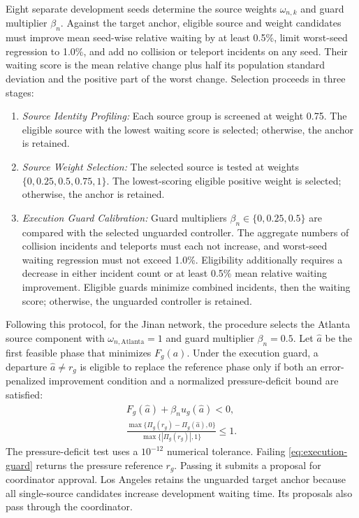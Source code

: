 \documentclass[letterpaper,journal]{IEEEtran}
\begin{document}
Eight separate development seeds determine the source weights $\omega_{n,k}$ and guard multiplier $\beta_n$. Against the target anchor, eligible source and weight candidates must improve mean seed-wise relative waiting by at least 0.5\%, limit worst-seed regression to 1.0\%, and add no collision or teleport incidents on any seed. Their waiting score is the mean relative change plus half its population standard deviation and the positive part of the worst change. Selection proceeds in three stages:
\begin{enumerate}
    \item \textit{Source Identity Profiling:} Each source group is screened at weight 0.75. The eligible source with the lowest waiting score is selected; otherwise, the anchor is retained.
    \item \textit{Source Weight Selection:} The selected source is tested at weights $\{0,0.25,0.5,0.75,1\}$. The lowest-scoring eligible positive weight is selected; otherwise, the anchor is retained.
    \item \textit{Execution Guard Calibration:} Guard multipliers $\beta_n\in\{0,0.25,0.5\}$ are compared with the selected unguarded controller. The aggregate numbers of collision incidents and teleports must each not increase, and worst-seed waiting regression must not exceed 1.0\%. Eligibility additionally requires a decrease in either incident count or at least 0.5\% mean relative waiting improvement. Eligible guards minimize combined incidents, then the waiting score; otherwise, the unguarded controller is retained.
\end{enumerate}

Following this protocol, for the Jinan network, the procedure selects the Atlanta source component with $\omega_{n,\mathrm{Atlanta}}=1$ and guard multiplier $\beta_n=0.5$. Let $\widehat a$ be the first feasible phase that minimizes $F_g(a)$. Under the execution guard, a departure $\widehat a\ne r_g$ is eligible to replace the reference phase only if both an error-penalized improvement condition and a normalized pressure-deficit bound are satisfied:
\begin{equation}
 \begin{gathered}
 F_g(\widehat a)+\beta_nu_g(\widehat a)<0,\\
 \frac{\max\{\Pi_g(r_g)-\Pi_g(\widehat a),0\}}
 {\max\{|\Pi_g(r_g)|,1\}}\leq1.
 \end{gathered}
 \label{eq:execution-guard}
\end{equation}
The pressure-deficit test uses a $10^{-12}$ numerical tolerance. Failing \eqref{eq:execution-guard} returns the pressure reference $r_g$. Passing it submits a proposal for coordinator approval. Los Angeles retains the unguarded target anchor because all single-source candidates increase development waiting time. Its proposals also pass through the coordinator.
\end{document}

